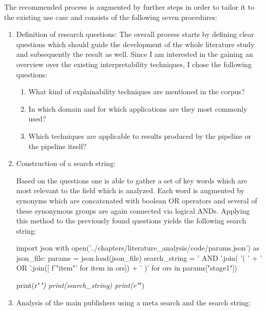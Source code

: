 The recommended process is augmented by further steps in order to tailor it to the existing use case and consists of the following seven procedures:
\begin{enumerate}
	
	\item Definition of research questions:
	The overall process starts by defining clear questions which should guide the development of the whole literature study and subsequently the result as well. Since I am interested in the gaining an overview over the existing interpretability techniques, I chose the following questions:
	
	\begin{enumerate}
		\item What kind of explainability techniques are mentioned in the corpus?
		\item In which domain and for which applications are they most commonly used?
		\item Which techniques are applicable to results produced by the pipeline or the pipeline itself? 
	\end{enumerate}
	
	\item Construction of a search string:
	
	Based on the questions one is able to gather a set of key words which are most relevant to the field which is analyzed. Each word is augmented by synonyms which are concatenated with boolean OR operators and several of these synonymous groups are again connected via logical ANDs. Applying this method to the previously found questions yields the following search string:
	
\begin{pycode}
import json
with open('../chapters/literature_analysis/code/params.json') as json_file:
	params = json.load(json_file)
	search_string = ' AND '.join( '( ' + ' OR '.join([ f'"{item}"' for item in ors]) + ' )' for ors in params["stage1"])
	
	print(r"\textit{")
	print(search_string)
	print(r"}")
\end{pycode}
	
	
	\item Analysis of the main publishers using a meta search and the search string:
	

\end{enumerate}
